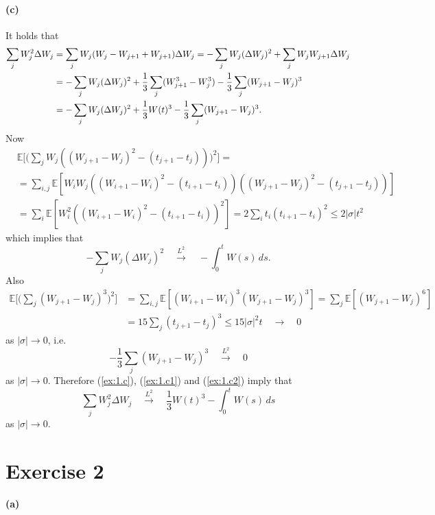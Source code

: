 \documentclass[a4paper,11pt]{article}
\theoremstyle{definition}
\theoremstyle{plain}
\theoremstyle{remark}
\begin{document}
\paragraph*{(c)}

It holds that
\begin{align}
\sum_j W_j^2\Delta W_j & = \sum_jW_j(W_j - W_{j+1} + W_{j+1})\Delta W_j = - \sum_jW_j(\Delta W_j)^2 + \sum_j W_j W_{j+1}\Delta W_j \notag \\ & =  - \sum_jW_j(\Delta W_j)^2 + \frac{1}{3}\sum_j(W^3_{j+1}-W^3_j) -\frac{1}{3}\sum_j(W_{j+1}-W_j)^3 \notag \\ & =  - \sum_jW_j(\Delta W_j)^2 + \frac{1}{3}W(t)^3 -\frac{1}{3}\sum_j(W_{j+1}-W_j)^3. \label{ex:1.c}
\end{align}
Now 
\begin{align*}
& \mathbb{E}\Big[\Big(\sum_jW_j((W_{j+1}-W_j)^2-(t_{j+1}-t_j))\Big)^2\Big] = \\ & = \sum_{i,j}\mathbb{E}[W_iW_j((W_{i+1}-W_i)^2-(t_{i+1}-t_i))((W_{j+1}-W_j)^2-(t_{j+1}-t_j))] \\ & = \sum_i\mathbb{E}[W_i^2((W_{i+1}-W_i)^2-(t_{i+1}-t_i))^2] = 2\sum_i t_i(t_{i+1}-t_i)^2 \leq 2|\sigma|t^2 
\end{align*}
which implies that
\begin{equation}\label{ex:1.c1}
- \sum_jW_j(\Delta W_j)^2 \quad\xrightarrow{L^2}\quad -\int_0^t W(s)\,ds.
\end{equation}
Also
\begin{align*}
\mathbb{E}\Big[\Big(\sum_j(W_{j+1}-W_j)^3\Big)^2\Big] & = \sum_{i,j}\mathbb{E}[(W_{i+1}-W_i)^3(W_{j+1}-W_j)^3] = \sum_{j}\mathbb{E}[(W_{j+1}-W_j)^6] \\ & = 15\sum_j(t_{j+1}-t_j)^3 \leq 15|\sigma|^2t \quad\rightarrow\quad 0 
\end{align*}
as $|\sigma|\to0$, i.e.
\begin{equation}\label{ex:1.c2}
-\frac{1}{3}\sum_j(W_{j+1}-W_j)^3 \quad\xrightarrow{L^2}\quad 0
\end{equation}
as $|\sigma|\to0$.
Therefore (\ref{ex:1.c}), (\ref{ex:1.c1}) and (\ref{ex:1.c2}) imply that
$$
\sum_j W_j^2\Delta W_j \quad\xrightarrow{L^2}\quad \frac{1}{3}W(t)^3 -\int_0^t W(s)\,ds
$$
as $|\sigma|\to0$.

\section*{Exercise 2}

\paragraph*{(a)} 
\end{document}
